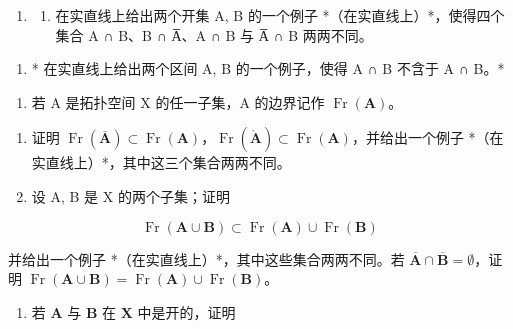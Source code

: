 \begin{enumerate}
\def\labelenumi{\arabic{enumi})}
\setcounter{enumi}{3}
\tightlist
\item
  \begin{enumerate}
  \def\labelenumii{\alph{enumii})}
  \tightlist
  \item
    在实直线上给出两个开集 A, B 的一个例子 *（在实直线上）*，使得四个集合 A ∩ B、B ∩ A̅、A ∩ B 与 A̅ ∩ B 两两不同。
  \end{enumerate}
\end{enumerate}

\begin{enumerate}
\def\labelenumi{\alph{enumi})}
\setcounter{enumi}{1}
\tightlist
\item
  * 在实直线上给出两个区间 A, B 的一个例子，使得 A ∩ B 不含于 A ∩ B。*
\end{enumerate}

\begin{enumerate}
\def\labelenumi{\arabic{enumi})}
\setcounter{enumi}{4}
\tightlist
\item
  若 A 是拓扑空间 X 的任一子集，A 的边界记作 \(\operatorname{Fr}(\mathbf{A})\)。
\end{enumerate}

\begin{enumerate}
\def\labelenumi{\alph{enumi})}
\item
  证明 \(\operatorname{Fr}(\overline{\mathbf{A}}) \subset \operatorname{Fr}(\mathbf{A})\)，\(\operatorname{Fr}(\mathring{\mathbf{A}}) \subset \operatorname{Fr}(\mathbf{A})\)，并给出一个例子 *（在实直线上）*，其中这三个集合两两不同。
\item
  设 A, B 是 X 的两个子集；证明
\end{enumerate}

\[
\operatorname{Fr} (\mathbf {A} \cup \mathbf {B}) \subset \operatorname{Fr} (\mathbf {A}) \cup \operatorname{Fr} (\mathbf {B})
\]

并给出一个例子 *（在实直线上）*，其中这些集合两两不同。若 \(\overline{\mathbf{A}} \cap \overline{\mathbf{B}} = \emptyset\)，证明 \(\operatorname{Fr}(\mathbf{A} \cup \mathbf{B}) = \operatorname{Fr}(\mathbf{A}) \cup \operatorname{Fr}(\mathbf{B})\)。

\begin{enumerate}
\def\labelenumi{\alph{enumi})}
\setcounter{enumi}{2}
\tightlist
\item
  若 \(\mathbf{A}\) 与 \(\mathbf{B}\) 在 \(\mathbf{X}\) 中是开的，证明
\end{enumerate}

